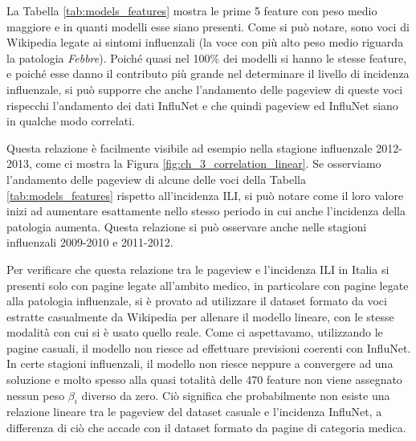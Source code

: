 La Tabella \ref{tab:models_features} mostra le prime 5 feature con peso medio maggiore e in quanti modelli 
esse siano presenti. Come si può notare, sono voci di Wikipedia legate ai sintomi influenzali (la voce con più alto 
peso medio riguarda la patologia \textit{Febbre}). Poiché quasi nel 100\% dei modelli si hanno le stesse feature, e poiché 
esse danno il contributo più grande nel determinare il livello di incidenza influenzale, si può supporre che anche 
l'andamento delle pageview di queste voci rispecchi l'andamento dei dati InfluNet e che quindi pageview ed InfluNet siano in 
qualche modo correlati.
\bigskip

Questa relazione è facilmente visibile ad esempio nella stagione influenzale 2012-2013, come ci mostra la Figura 
\ref{fig:ch_3_correlation_linear}. Se osserviamo l'andamento delle pageview di alcune delle voci della Tabella 
\ref{tab:models_features} rispetto all'incidenza ILI, si può notare come il loro valore inizi ad aumentare esattamente 
nello stesso periodo in cui anche l'incidenza della patologia aumenta. Questa relazione si può osservare anche nelle stagioni 
influenzali 2009-2010 e 2011-2012.
\bigskip

Per verificare che questa relazione tra le pageview e l'incidenza ILI in Italia si presenti solo con pagine legate all'ambito 
medico, in particolare con pagine legate alla patologia influenzale, si è provato ad 
utilizzare il dataset formato da voci estratte casualmente da Wikipedia per allenare il modello lineare, con le stesse 
modalità con cui si è usato quello reale. Come ci aspettavamo, utilizzando le pagine casuali, il modello non riesce ad 
effettuare previsioni coerenti con InfluNet. In certe stagioni influenzali, il modello non riesce neppure a convergere ad una 
soluzione e molto spesso alla quasi totalità delle 470 feature non viene assegnato nessun peso $\beta_i$ diverso da zero. Ciò 
significa che probabilmente non esiste una relazione lineare tra le pageview del dataset casuale e l'incidenza InfluNet, a 
differenza di ciò che accade con il dataset formato da pagine di categoria medica.
\bigskip

